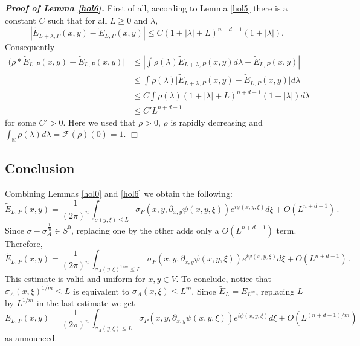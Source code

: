 \documentclass[10pt,twoside]{article}
\newcommand{\fou}{\mathcal{F}}
\newcommand{\R}{\mathbb{R}}
\newenvironment{prf}[1][]
{\vskip 2mm  {\it \bf Proof#1. }}{$\Box$ \vskip 2mm}
\numberwithin{theorem}{section}
\begin{document}
\begin{prf}[ of Lemma \ref{hol6}]
First of all, according to Lemma \ref{hol5} there is a constant $C$ such that for all $L\geq 0$ and $\lambda$,
\begin{equation*}
|\tilde{E}_{L+\lambda,P}(x,y)-\tilde{E}_{L,P}(x,y)|\leq C(1+|\lambda|+L)^{n+d-1}(1+|\lambda|).
\end{equation*}
Consequently
\begin{align*}
(\rho*\tilde{E}_{L,P}(x,y)-\tilde{E}_{L,P}(x,y)|&\leq|\int\rho(\lambda)\tilde{E}_{L+\lambda,P}(x,y)d\lambda-\tilde{E}_{L,P}(x,y)|\\
                                               &\leq\int\rho(\lambda)\Big|\tilde{E}_{L+\lambda,P}(x,y)-\tilde{E}_{L,P}(x,y)\Big|d\lambda\\
                                               &\leq C\int\rho(\lambda)(1+|\lambda|+L)^{n+d-1}(1+|\lambda|)d\lambda\\
                                               &\leq C'L^{n+d-1}
\end{align*}
for some $C'>0$. Here we used that $\rho>0$, $\rho$ is rapidly decreasing and $\int_{\R}\rho(\lambda)d\lambda=\fou(\rho)(0)=1$.
\end{prf}



\subsection{Conclusion}

Combining Lemmas \ref{hol0} and \ref{hol6} we obtain the following:
\[
\tilde{E}_{L,P}(x,y)=\frac{1}{(2\pi)^n}\int_{\sigma(y,\xi)\leq L} \sigma_P(x,y,\partial_{x,y}\psi(x,y,\xi)) e^{i\psi(x,y,\xi)}d\xi + O(L^{n+d-1})\, .
\]
Since $\sigma-\sigma_A^{\frac{1}{m}}\in S^0$, replacing one by the other adds only a $O(L^{n+d-1})$ term. Therefore,
\[
\tilde{E}_{L,P}(x,y)=\frac{1}{(2\pi)^n}\int_{\sigma_A(y,\xi)^{1/m}\leq L} \sigma_P(x,y,\partial_{x,y}\psi(x,y,\xi)) e^{i\psi(x,y,\xi)}d\xi + O(L^{n+d-1})\, .
\]
This estimate is valid and uniform for $x,y\in V$. To conclude, notice that $\sigma_A(x,\xi)^{1/m}\leq L$ is equivalent to $\sigma_A(x,\xi)\leq L^m$. Since $\tilde{E}_L=E_{L^m}$, replacing $L$ by $L^{1/m}$ in the last estimate we get
\[
E_{L,P}(x,y)=\frac{1}{(2\pi)^n}\int_{\sigma_A(y,\xi)
\leq L} \sigma_P(x,y,\partial_{x,y}\psi(x,y,\xi)) e^{i\psi(x,y,\xi)}d\xi + O(L^{(n+d-1)/m})
\]
as announced.

\nocite{*}


\end{document}
